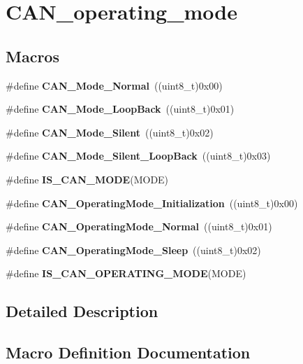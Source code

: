 \section{C\+A\+N\+\_\+operating\+\_\+mode}
\label{group__CAN__operating__mode}
\subsection*{Macros}
\begin{DoxyCompactItemize}
\item 
\#define \textbf{ C\+A\+N\+\_\+\+Mode\+\_\+\+Normal}~((uint8\+\_\+t)0x00)
\item 
\#define \textbf{ C\+A\+N\+\_\+\+Mode\+\_\+\+Loop\+Back}~((uint8\+\_\+t)0x01)
\item 
\#define \textbf{ C\+A\+N\+\_\+\+Mode\+\_\+\+Silent}~((uint8\+\_\+t)0x02)
\item 
\#define \textbf{ C\+A\+N\+\_\+\+Mode\+\_\+\+Silent\+\_\+\+Loop\+Back}~((uint8\+\_\+t)0x03)
\item 
\#define \textbf{ I\+S\+\_\+\+C\+A\+N\+\_\+\+M\+O\+DE}(M\+O\+DE)
\item 
\#define \textbf{ C\+A\+N\+\_\+\+Operating\+Mode\+\_\+\+Initialization}~((uint8\+\_\+t)0x00)
\item 
\#define \textbf{ C\+A\+N\+\_\+\+Operating\+Mode\+\_\+\+Normal}~((uint8\+\_\+t)0x01)
\item 
\#define \textbf{ C\+A\+N\+\_\+\+Operating\+Mode\+\_\+\+Sleep}~((uint8\+\_\+t)0x02)
\item 
\#define \textbf{ I\+S\+\_\+\+C\+A\+N\+\_\+\+O\+P\+E\+R\+A\+T\+I\+N\+G\+\_\+\+M\+O\+DE}(M\+O\+DE)
\end{DoxyCompactItemize}


\subsection{Detailed Description}


\subsection{Macro Definition Documentation}
\mbox{\label{group__CAN__operating__mode_gaad036c944403186eb3496ff65020c0ee}} 
